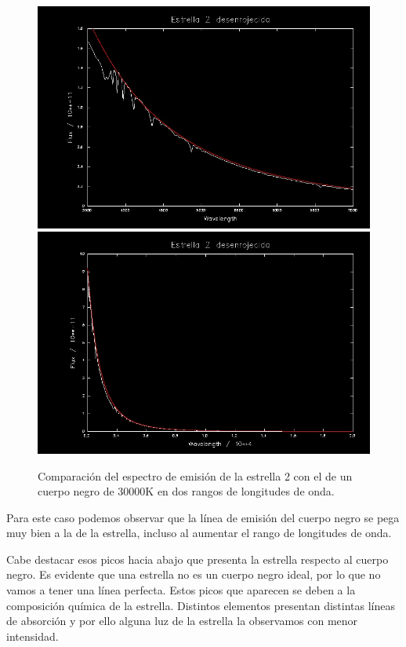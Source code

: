 \documentclass{aa} %
\begin{document}
\begin{figure}[h!]
\begin{center}
\includegraphics[scale=0.15]{2 bbody.png}
\includegraphics[scale=0.15]{2 bigger.png}
\caption{Comparación del espectro de emisión de la estrella 2 con el de un cuerpo negro de 30000K en dos rangos de longitudes de onda.}
\label{fig:bbody2}
\end{center}
\end{figure}

Para este caso podemos observar que la línea de emisión del cuerpo negro se pega muy bien a la de la estrella, incluso al aumentar el rango de longitudes de onda.

Cabe destacar esos picos hacia abajo que presenta la estrella respecto al cuerpo negro. Es evidente que una estrella no es un cuerpo negro ideal, por lo que no vamos a tener una línea perfecta. Estos picos que aparecen se deben a la composición química de la estrella. Distintos elementos presentan distintas líneas de absorción y por ello alguna luz de la estrella la observamos con menor intensidad.
\end{document}

